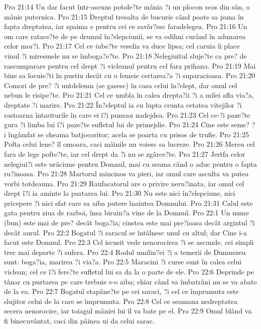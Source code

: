 Pro 21:14  Un dar facut într-ascuns potole?te mânia ?i un plocon scos din sân, o mânie puternica.
Pro 21:15  Dreptul tresalta de bucurie când poate sa puna în fapta dreptatea, iar spaima e pentru cei ce savâr?esc faradelegea.
Pro 21:16  Un om care ratace?te de pe drumul în?elepciunii, se va odihni curând în adunarea celor mor?i.
Pro 21:17  Cel ce iube?te veselia va duce lipsa; cel caruia îi place vinul ?i miresmele nu se îmboga?e?te.
Pro 21:18  Nelegiuitul sluje?te ca pre? de rascumparare pentru cel drept ?i vicleanul pentru cel fara prihana.
Pro 21:19  Mai bine sa locuie?ti în pustiu decât cu o femeie certarea?a ?i suparacioasa.
Pro 21:20  Comori de pre? ?i untdelemn (se gasesc) în casa celui în?elept, dar omul cel nebun le risipe?te.
Pro 21:21  Cel ce umbla în calea drepta?ii ?i a milei afla via?a, dreptate ?i marire.
Pro 21:22  În?eleptul ia cu lupta crunta cetatea vitejilor ?i rastoarna întariturile în care ei î?i puneau nadejdea.
Pro 21:23  Cel ce-?i paze?te gura ?i limba lui î?i paze?te sufletul lui de primejdie.
Pro 21:24  Cine este seme? ?i îngâmfat se cheama batjocoritor; acela se poarta cu prisos de trufie.
Pro 21:25  Pofta celui lene? îl omoara, caci mâinile nu voiesc sa lucreze.
Pro 21:26  Mereu cel fara de lege pofte?te, iar cel drept da ?i nu se zgârce?te.
Pro 21:27  Jertfa celor nelegiui?i este urâciune pentru Domnul, mai cu seama când o aduc pentru o fapta ru?inoasa.
Pro 21:28  Martorul mincinos va pieri, iar omul care asculta va putea vorbi totdeauna.
Pro 21:29  Raufacatorul are o privire neru?inata, iar omul cel drept î?i ia aminte la purtarea lui.
Pro 21:30  Nu este nici în?elepciune, nici pricepere ?i nici sfat care sa aiba putere înaintea Domnului.
Pro 21:31  Calul este gata pentru ziua de razboi, însa biruin?a vine de la Domnul.
Pro 22:1  Un nume (bun) este mai de pre? decât boga?ia; cinstea este mai pre?ioasa decât argintul ?i decât aurul.
Pro 22:2  Bogatul ?i saracul se întâlnesc unul cu altul; dar Cine i-a facut este Domnul.
Pro 22:3  Cel iscusit vede nenorocirea ?i se ascunde, cei simpli trec mai departe ?i sufera.
Pro 22:4  Rodul umilin?ei ?i a temerii de Dumnezeu sunt: boga?ia, marirea ?i via?a.
Pro 22:5  Maracini ?i curse sunt în calea celui viclean; cel ce î?i fere?te sufletul lui sa da la o parte de ele.
Pro 22:6  Deprinde pe tânar cu purtarea pe care trebuie s-o aiba; chiar când va îmbatrâni nu se va abate de la ea.
Pro 22:7  Bogatul stapâne?te pe cei saraci, ?i cel ce împrumuta este slujitor celui de la care se împrumuta.
Pro 22:8  Cel ce seamana nedreptatea secera nenorocire, iar toiagul mâniei lui îl va bate pe el.
Pro 22:9  Omul blând va fi binecuvântat, caci din pâinea ui da celui sarac.
